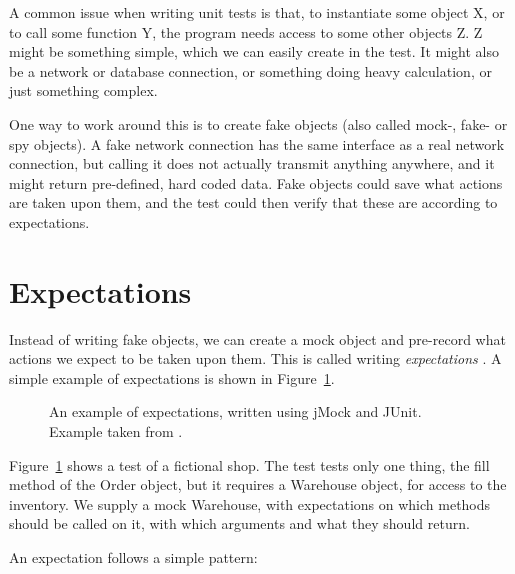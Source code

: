 \documentclass[a4paper,11pt]{kth-mag}
\theoremstyle{definition}
\begin{document}
A common issue when writing unit tests is that, to instantiate some object X,
or to call some function Y, the program needs access to some other objects Z. Z
might be something simple, which we can easily create in the test. It might
also be a network or database connection, or something doing heavy calculation,
or just something complex.

One way to work around this is to create fake objects (also called mock-, fake-
or spy objects). A fake network connection has the same interface as a real
network connection, but calling it does not actually transmit anything
anywhere, and it might return pre-defined, hard coded data. Fake objects could
save what actions are taken upon them, and the test could then verify that
these are according to expectations.


\section{Expectations} \label{section-expectations}

Instead of writing fake objects, we can create a mock object and pre-record
what actions we expect to be taken upon them. This is called writing
\textit{expectations} \cite{fowler07expectations}. A simple example of
expectations is shown in Figure~\ref{figure-expectations}.

\begin{figure}[h!]
	\begin{center}
	\begin{minipage}{0.9\textwidth}
		\lstset{language=Java}
		
	\end{minipage}
	\end{center}

	\caption{An example of expectations, written using jMock and JUnit.
	Example taken from \cite{fowler07expectations}.}
	\label{figure-expectations}
\end{figure}

Figure~\ref{figure-expectations} shows a test of a fictional shop. The test
tests only one thing, the fill method of the Order object, but it requires a
Warehouse object, for access to the inventory. We supply a mock Warehouse, with
expectations on which methods should be called on it, with which arguments and
what they should return.

An expectation follows a simple pattern:
\end{document}
